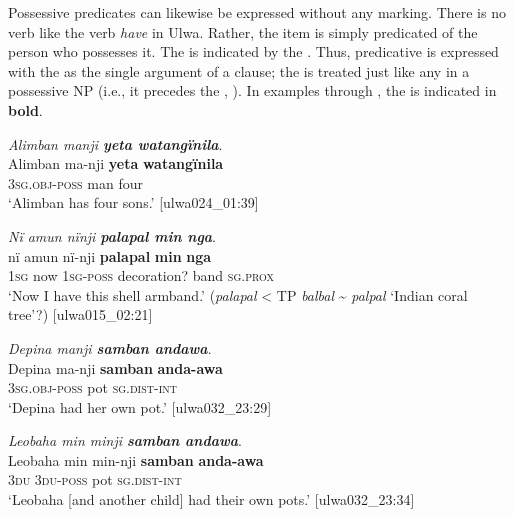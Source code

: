 Possessive predicates  can likewise be expressed without any marking. There is no verb like the  verb \textit{have} in Ulwa. Rather, the  item is simply predicated of the person who possesses it. The  is indicated by the . Thus, predicative  is expressed with the  as the single argument of a  clause; the  is treated just like any  in a possessive NP (i.e., it precedes the , ). In examples  through , the  is indicated in \textbf{bold}.

\ea%
    \label{ex:pred:30}
          \textit{Alimban manji \textbf{yeta watangïnila}}.\\
\gll Alimban  ma-nji      \textbf{yeta}  \textbf{watangïnila}\\
    [name]    3\textsc{sg.obj-poss}  man  four\\
\glt `Alimban has four sons.’ [ulwa024\_01:39]
\z

\ea%
    \label{ex:pred:31}
          \textit{Nï amun nïnji \textbf{palapal min nga}}.\\
\gll nï    amun  nï-nji    \textbf{palapal}    \textbf{min}  \textbf{nga}\\
    1\textsc{sg}  now  1\textsc{sg-poss}  decoration?  band  \textsc{sg.prox}\\
\glt    ‘Now I have this shell armband.’ (\textit{palapal} < TP \textit{balbal} {\textasciitilde} \textit{palpal} ‘Indian coral tree’?) [ulwa015\_02:21]
\z

\ea%
    \label{ex:pred:32}
          \textit{Depina manji \textbf{samban andawa}}.\\
\gll Depina  ma-nji      \textbf{samban}  \textbf{anda-awa}\\
    [name]  3\textsc{sg.obj-poss}  pot      \textsc{sg.dist{}-int}\\
\glt `Depina had her own pot.’ [ulwa032\_23:29]
\z

\ea%
    \label{ex:pred:33}
          \textit{Leobaha min minji \textbf{samban andawa}}.\\
\gll Leobaha  min  min-nji    \textbf{samban}  \textbf{anda-awa}\\
    [name]    3\textsc{du}  3\textsc{du-poss}  pot      \textsc{sg.dist{}-int}\\
\glt `Leobaha [and another child] had their own pots.’ [ulwa032\_23:34]
\z

